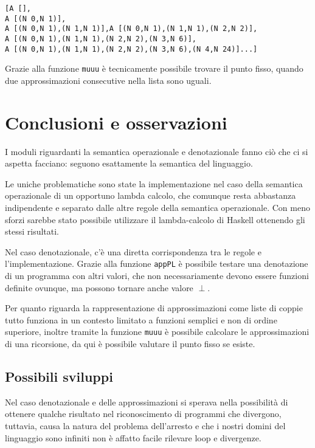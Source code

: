 \documentclass{article}
\begin{document}
\begin{verbatim}
[A [],
A [(N 0,N 1)],
A [(N 0,N 1),(N 1,N 1)],A [(N 0,N 1),(N 1,N 1),(N 2,N 2)],
A [(N 0,N 1),(N 1,N 1),(N 2,N 2),(N 3,N 6)],
A [(N 0,N 1),(N 1,N 1),(N 2,N 2),(N 3,N 6),(N 4,N 24)]...]
\end{verbatim}

Grazie alla funzione \texttt{muuu} è tecnicamente possibile trovare il punto fisso, quando due approssimazioni consecutive nella lista sono uguali.

\section{Conclusioni e osservazioni}

I moduli riguardanti la semantica operazionale e denotazionale fanno ciò che ci si aspetta facciano: seguono esattamente la semantica del linguaggio.

Le uniche problematiche sono state la implementazione nel caso della semantica operazionale di un opportuno lambda calcolo, che comunque resta abbastanza indipendente e separato dalle altre regole della semantica operazionale. Con meno sforzi sarebbe stato possibile utilizzare il lambda-calcolo di Haskell ottenendo gli stessi risultati.

Nel caso denotazionale, c'è una diretta corrispondenza tra le regole e l'implementazione.
Grazie alla funzione \texttt{appPL} è possibile testare una denotazione di un programma con altri valori, che non necessariamente devono essere funzioni definite ovunque, ma possono tornare anche valore $\perp$.

Per quanto riguarda la rappresentazione di approssimazioni come liste di coppie tutto funziona in un contesto limitato a funzioni semplici e non di ordine superiore, inoltre tramite la funzione \texttt{muuu} è possibile calcolare le approssimazioni di una ricorsione, da qui è possibile valutare il punto fisso se esiste.


\subsection{Possibili sviluppi}
Nel caso denotazionale e delle approssimazioni si sperava nella possibilità di ottenere qualche risultato nel riconoscimento di programmi che divergono, tuttavia, causa la natura del problema dell'arresto e che i nostri domini del linguaggio sono infiniti non è affatto facile rilevare loop e divergenze.
\end{document}
